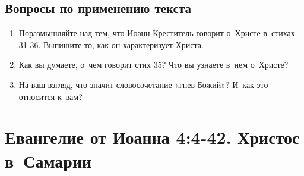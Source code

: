 \documentclass[a4paper,12pt]{article}
\begin{document}
\subsection*{Вопросы по применению текста} 
\begin{enumerate}
    \item Поразмышляйте над тем, что Иоанн Креститель говорит о~Христе в~стихах 31-36. Выпишите то, как он характеризует Христа. 
    
    \myline
    
    \myline
    \item Как вы думаете, о~чем говорит стих 35? Что вы узнаете в~нем о~Христе? 
    
    \myline
    
    \myline
    \item На ваш взгляд, что значит словосочетание «гнев Божий»? И~как это относится к~вам?
    
    \myline
    
    \myline
\end{enumerate}



\section{Евангелие от Иоанна 4:4-42. Христос в~Самарии}
\end{document}
